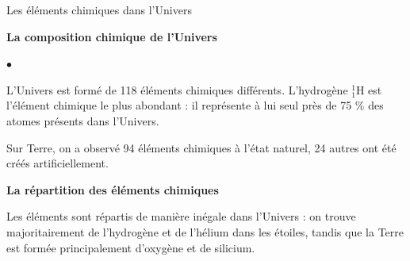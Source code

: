 \documentclass[24pt]{article}
\begin{document}
\begin{concept}{Les éléments chimiques dans l’Univers}
    \begin{minipage}[c]{0.5\textwidth}
        \begin{center}
            \textbf{La composition chimique de l’Univers}
        \end{center}
        \begin{list}{$\bullet$}{}
            \item L’Univers est formé de 118 éléments chimiques différents.
                  L’hydrogène $_1^1$H est l’élément chimique le plus abondant :
                  il représente à lui seul près de 75 \%
                  des atomes présents dans l’Univers.

            \item Sur Terre, on a observé 94 éléments chimiques
                  à l’état naturel, 24 autres ont été créés artificiellement.
        \end{list}
    \end{minipage}
    \hspace{0.05\textwidth}
    \begin{minipage}[c]{0.4\textwidth}
        \begin{center}
            \textbf{La répartition des éléments chimiques}
        \end{center}

        Les éléments sont répartis de manière inégale dans l’Univers :
        on trouve majoritairement de
        l’hydrogène et de l’hélium dans les étoiles, tandis que la Terre
        est formée principalement d’oxygène et de silicium.
    \end{minipage}
\end{concept}
\end{document}
